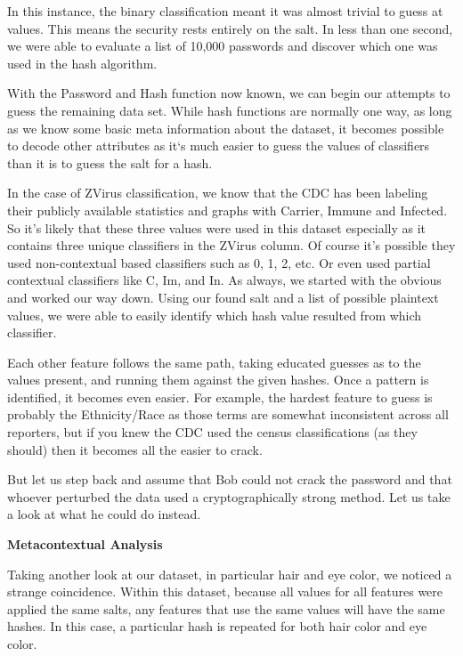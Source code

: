 \documentclass[10pt,journal,compsoc]{IEEEtran}
\begin{document}
In this instance, the binary classification meant it was almost trivial to guess at values.  This means the security rests entirely on the salt.  In less than one second, we were able to evaluate a list of 10,000 passwords and discover which one was used in the hash algorithm.

With the Password and Hash function now known, we can begin our attempts to guess the remaining data set. While hash functions are normally one way, as long as we know some basic meta information about the dataset, it becomes possible to decode other attributes as it`s much easier to guess the values of classifiers than it is to guess the salt for a hash.

In the case of ZVirus classification, we know that the CDC has been labeling their publicly available statistics and graphs with Carrier, Immune and Infected. So it's likely that these three values were used in this dataset especially as it contains three unique classifiers in the ZVirus column. Of course it's possible they used non-contextual based classifiers such as 0, 1, 2, etc. Or even used partial contextual classifiers like C, Im, and In. As always, we started with the obvious and worked our way down. Using our found salt and a list of possible plaintext values, we were able to easily identify which hash value resulted from which classifier.

Each other feature follows the same path, taking educated guesses as to the values present, and running them against the given hashes. Once a pattern is identified, it becomes even easier. For example, the hardest feature to guess is probably the Ethnicity/Race as those terms are somewhat inconsistent across all reporters, but if you knew the CDC used the census classifications (as they should) then it becomes all the easier to crack.

But let us step back and assume that Bob could not crack the password and that whoever perturbed the data used a cryptographically strong method. Let us take a look at what he could do instead.\linebreak

\noindent \textbf{Metacontextual Analysis}

Taking another look at our dataset, in particular hair and eye color, we noticed a strange coincidence. Within this dataset, because all values for all features were applied the same salts, any features that use the same values will have the same hashes. In this case, a particular hash is repeated for both hair color and eye color.
\end{document}
